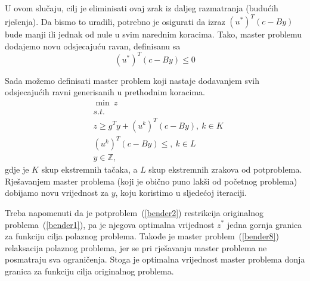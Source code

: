 \documentclass[a4paper, utf8, 11pt, colorlinks]{book}
\begin{document}
U ovom slučaju, cilj je eliminisati ovaj zrak iz daljeg razmatranja (budućih rješenja). Da bismo to uradili, potrebno je osigurati da izraz $(u^*)^T(c-By)$ bude manji ili jednak od nule u svim narednim koracima. Tako, master problemu dodajemo novu odsjecajuću ravan, definisanu sa
\begin{equation}
	\label{bender7}
	(u^*)^T(c-By)\leqslant 0
\end{equation}
 
Sada možemo definisati master problem koji nastaje dodavanjem svih odsjecajućih ravni generisanih u prethodnim koracima.
  \begin{equation}
	\begin{aligned}\label{bender8}
		&\min\ z\\
		&s.t.\  \\
		&z \geq g^Ty+(u^k)^T(c-By) , \ k \in K\\
		& (u^k)^T(c-By) \leq, \ k \in L\\
		&y \in \mathbb{Z},
	\end{aligned}
\end{equation}
 gdje je $K$ skup ekstremnih tačaka, a $L$ skup ekstremnih zrakova od potproblema. Rješavanjem master problema (koji je obično puno lakši od početnog problema) dobijamo novu vrijednost za $y$, koju koristimo u sljedećoj iteraciji.
 
 Treba napomenuti da je potproblem~(\ref{bender2}) restrikcija originalnog problema~(\ref{bender1}), pa je njegova optimalna vrijednost $z^*$ jedna gornja granica za funkciju cilja polaznog problema. Takođe je master problem~(\ref{bender8}) relaksacija polaznog problema, jer se pri rješavanju master problema ne posmatraju sva ograničenja. Stoga je optimalna vrijednost master problema donja granica za funkciju cilja originalnog problema.
 

 
 
\end{document}
